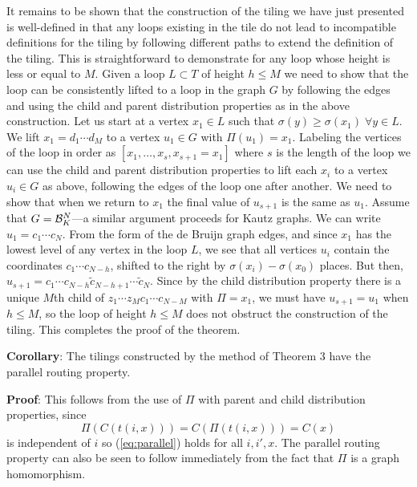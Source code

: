 \documentclass[12pt]{article}
\def\dk{{\cal B}_K}
\begin{document}
It remains to be shown that the construction of the tiling we have
just presented is well-defined in that any loops existing in the tile
do not lead to incompatible definitions for the tiling by following
different paths to extend the definition of the tiling.
This is straightforward to demonstrate for any loop whose height is
less or equal to $M$. Given a loop $L \subset T$ of height $h \leq M$
we need to show that
the loop can be consistently lifted to a loop in the graph $G$ by
following the edges and using the child and parent distribution
properties as in the above construction.  Let us start at a vertex
$x_1 \in L$ such that $\sigma (y) \geq \sigma (x_1) \;\forall y \in L$.
We lift $x_1 = d_1 \cdots d_M$ to a vertex $u_1\in G$ with
$\Pi (u_1) = x_1$.  Labeling the vertices of the loop in order as
$[x_1, \ldots, x_s, x_{s + 1} = x_1]$ where $s$ is the length of the
loop we can use the 
child and parent distribution properties to lift each $x_i$ to a
vertex $u_i \in G$ as above, following the edges of the loop one after
another.  We need to show that when we return to $x_1$ the final value
of $u_{s + 1}$ is the same as $u_1$.  Assume that $G =\dk^N$---a
similar argument proceeds for Kautz graphs.  We can write
$u_1 = c_1 \cdots c_N$.  From the form of the de Bruijn graph edges,
and since $x_1$ has the lowest level of any vertex in the loop $L$, we
see that all vertices $u_i$ contain the coordinates $c_1 \cdots c_{N
  -h}$, shifted to the right by $\sigma (x_i)-\sigma (x_0)$ places.
But then, $u_{s + 1}= c_1 \cdots c_{N -h} \tilde{c}_{N -h + 1} \cdots
\tilde{c}_{N}$.  Since by the child distribution property
there is a unique $M$th child of $z_1 \cdots z_M c_1 \cdots c_{N -M}$
with $\Pi = x_1$, we must have $u_{s + 1} = u_1$ when $h \leq M$, so
the loop of height $h \leq M$ does not obstruct the construction of
the tiling.  This completes the proof of the theorem.
\vspace*{0.1in}

\noindent
{\bf Corollary}: The tilings constructed by the method of Theorem 3
have the parallel routing property.
\vspace*{0.1in}

\noindent
{\bf Proof}: This follows from the use of $\Pi$ with parent and child
distribution properties, since
\begin{equation}
\Pi (C (t (i, x))) = C (\Pi (t (i, x))) = C (x)
\end{equation}
is independent of $i$ so (\ref{eq:parallel}) holds for all $i, i', x$.
The parallel routing property can also be seen to follow immediately
from the fact that $\Pi$ is a graph homomorphism.
\vspace*{0.2in}
\end{document}
